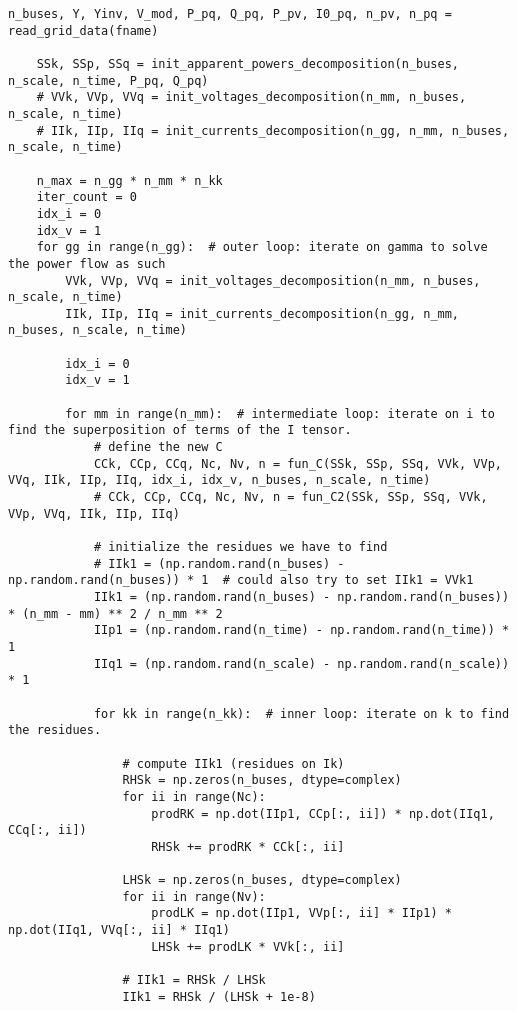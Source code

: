 \begin{lstlisting}[caption={Proper Generalized Decomposition code in Python}]
    n_buses, Y, Yinv, V_mod, P_pq, Q_pq, P_pv, I0_pq, n_pv, n_pq = read_grid_data(fname)

    SSk, SSp, SSq = init_apparent_powers_decomposition(n_buses, n_scale, n_time, P_pq, Q_pq)
    # VVk, VVp, VVq = init_voltages_decomposition(n_mm, n_buses, n_scale, n_time)
    # IIk, IIp, IIq = init_currents_decomposition(n_gg, n_mm, n_buses, n_scale, n_time)

    n_max = n_gg * n_mm * n_kk
    iter_count = 0
    idx_i = 0
    idx_v = 1
    for gg in range(n_gg):  # outer loop: iterate on gamma to solve the power flow as such
        VVk, VVp, VVq = init_voltages_decomposition(n_mm, n_buses, n_scale, n_time)
        IIk, IIp, IIq = init_currents_decomposition(n_gg, n_mm, n_buses, n_scale, n_time)

        idx_i = 0
        idx_v = 1

        for mm in range(n_mm):  # intermediate loop: iterate on i to find the superposition of terms of the I tensor.
            # define the new C
            CCk, CCp, CCq, Nc, Nv, n = fun_C(SSk, SSp, SSq, VVk, VVp, VVq, IIk, IIp, IIq, idx_i, idx_v, n_buses, n_scale, n_time)
            # CCk, CCp, CCq, Nc, Nv, n = fun_C2(SSk, SSp, SSq, VVk, VVp, VVq, IIk, IIp, IIq)

            # initialize the residues we have to find
            # IIk1 = (np.random.rand(n_buses) - np.random.rand(n_buses)) * 1  # could also try to set IIk1 = VVk1
            IIk1 = (np.random.rand(n_buses) - np.random.rand(n_buses)) * (n_mm - mm) ** 2 / n_mm ** 2
            IIp1 = (np.random.rand(n_time) - np.random.rand(n_time)) * 1 
            IIq1 = (np.random.rand(n_scale) - np.random.rand(n_scale)) * 1

            for kk in range(n_kk):  # inner loop: iterate on k to find the residues.

                # compute IIk1 (residues on Ik)
                RHSk = np.zeros(n_buses, dtype=complex)
                for ii in range(Nc):
                    prodRK = np.dot(IIp1, CCp[:, ii]) * np.dot(IIq1, CCq[:, ii])
                    RHSk += prodRK * CCk[:, ii]

                LHSk = np.zeros(n_buses, dtype=complex)
                for ii in range(Nv):
                    prodLK = np.dot(IIp1, VVp[:, ii] * IIp1) * np.dot(IIq1, VVq[:, ii] * IIq1)
                    LHSk += prodLK * VVk[:, ii]

                # IIk1 = RHSk / LHSk
                IIk1 = RHSk / (LHSk + 1e-8)


\end{lstlisting}
